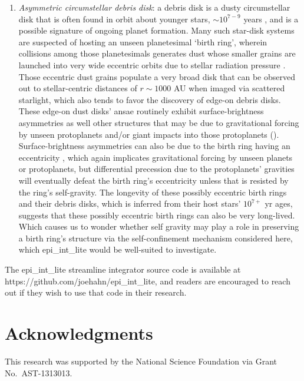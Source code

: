 \documentclass[preprint]{aastex62}
\begin{document}
\begin{enumerate}
\item {\it Asymmetric circumstellar debris disk}: a debris disk is a dusty circumstellar disk that is often found
in orbit about younger stars, $\sim10^{7-9}$ years \citep{Matthews18}, 
and is a possible signature of ongoing planet formation. Many such star-disk systems are suspected of hosting an unseen
planetesimal `birth ring', wherein collisions among those planetesimals generates dust whose smaller grains are 
launched into very wide eccentric orbits due to stellar radiation pressure \citep{SC06}.
Those eccentric dust grains populate a very broad disk that can be observed out to stellar-centric
distances of $r\sim1000$ AU when imaged via scattered starlight, which also tends to favor the discovery of 
edge-on debris disks. These edge-on dust disks' ansae
routinely exhibit surface-brightness asymmetries as well other structures that
may be due to gravitational forcing by unseen protoplanets and/or giant impacts into those protoplanets
(\citealt{Jetal23}). Surface-brightness asymmetries can also be due to the birth ring having an
eccentricity \citep{H09}, which again implicates gravitational forcing by unseen planets or protoplanets, but differential
precession due to the protoplanets' gravities will eventually defeat the birth ring's eccentricity
unless that is resisted by the ring's self-gravity. 
The longevity of these possibly eccentric birth rings and their debris disks, which is inferred from their 
host stars' $10^{7+}$ yr ages, suggests that these possibly eccentric
birth rings can also be very long-lived. Which causes us to wonder whether
self gravity may play a role in preserving a birth ring's structure
via the self-confinement mechanism considered here, which epi\_int\_lite would be well-suited to
investigate.

\end{enumerate}

The epi\_int\_lite streamline integrator source code is available at https://github.com/joehahn/epi\_int\_lite,
and readers are encouraged to reach out if they wish to use that code in their research.


\acknowledgments
\section{Acknowledgments}
\label{sec:Acknowledgments}

This research was supported by the National Science Foundation via Grant No.\ AST-1313013.


\appendix
\end{document}
